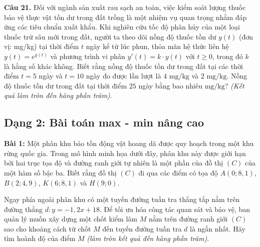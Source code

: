 \documentclass[12pt]{article}
\begin{document}
	\vspace{0.6cm}
	\noindent \textbf{Câu 21.} Đối với ngành sản xuất rau sạch an toàn, việc kiểm soát lượng thuốc bảo vệ thực vật tồn dư trong đất trồng là một nhiệm vụ quan trọng nhằm đáp ứng các tiêu chuẩn xuất khẩu. Khi nghiên cứu tốc độ phân hủy của một loại thuốc trừ sâu mới trong đất, người ta theo dõi nồng độ thuốc tồn dư $y(t)$ (đơn vị: mg/kg) tại thời điểm $t$ ngày kể từ lúc phun, thỏa mãn hệ thức liên hệ $y(t) = e^{g(t)}$ và phương trình vi phân $y'(t) = k \cdot y(t)$ với $t \ge 0$, trong đó $k$ là hằng số khác không. Biết rằng nồng độ thuốc tồn dư trong đất tại các thời điểm $t = 5$ ngày và $t = 10$ ngày đo được lần lượt là $4\text{ mg/kg}$ và $2\text{ mg/kg}$. Nồng độ thuốc tồn dư trong đất tại thời điểm $25$ ngày bằng bao nhiêu $\text{mg/kg}$? \textit{(Kết quả làm tròn đến hàng phần trăm)}.
	
	\newpage
	\subsection*{Dạng 2: Bài toán max - min nâng cao}

	
	\noindent \textbf{Bài 1:} Một phân khu bảo tồn động vật hoang dã được quy hoạch trong một khu rừng quốc gia. Trong mô hình minh họa dưới đây, phân khu này được giới hạn bởi hai trục tọa độ và đường ranh giới tự nhiên là một phần của đồ thị $(C)$ của một hàm số bậc ba. Biết rằng đồ thị $(C)$ đi qua các điểm có tọa độ $A(0; 8{,}1)$, $B(2; 4{,}9)$, $K(6; 8{,}1)$ và $H(9; 0)$.
	
	Ngay phía ngoài phân khu có một tuyến đường tuần tra thẳng tắp nằm trên đường thẳng $d: y = -1{,}2x + 18$. Để tối ưu hóa công tác quan sát và bảo vệ, ban quản lý muốn xây dựng một chốt kiểm lâm $M$ nằm trên đường ranh giới $(C)$ sao cho khoảng cách từ chốt $M$ đến tuyến đường tuần tra $d$ là ngắn nhất. Hãy tìm hoành độ của điểm $M$ \textit{(làm tròn kết quả đến hàng phần trăm)}.
	
\end{document}
